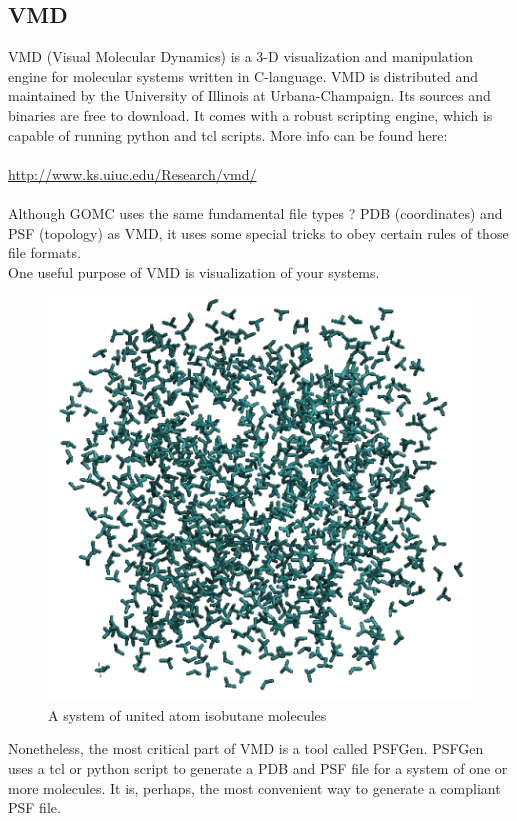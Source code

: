 \subsection{VMD}
VMD (Visual Molecular Dynamics) is a 3-D visualization and manipulation engine for molecular systems written in C-language. VMD is distributed and maintained by the University of Illinois at Urbana-Champaign.  Its sources and binaries are free to download. It comes with a robust scripting engine, which is capable of running python and tcl scripts.
More info can be found here:\\\\
\url{http://www.ks.uiuc.edu/Research/vmd/}\\\\
Although GOMC uses the same fundamental file types ? PDB (coordinates) and PSF (topology) as VMD, it uses some special tricks to obey certain rules of those file formats.\\
One useful purpose of VMD is visualization of your systems.
\begin{figure}[H]
\centering
\includegraphics[scale=0.6]{images/vmd}
\caption{A system of united atom isobutane molecules}
\end{figure}
Nonetheless, the most critical part of VMD is a tool called PSFGen.  PSFGen uses a tcl or python script to generate a PDB and PSF file for a system of one or more molecules.  It is, perhaps, the most convenient way to generate a compliant PSF file.
